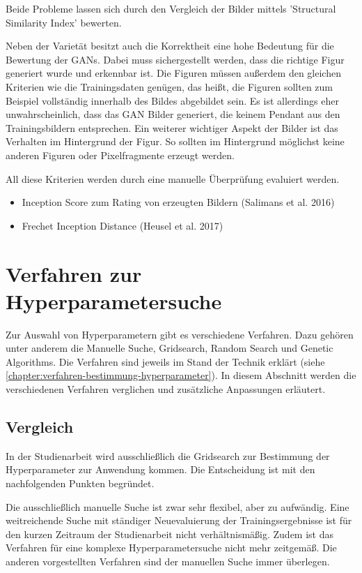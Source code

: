 Beide Probleme lassen sich durch den Vergleich der Bilder mittels 'Structural Similarity Index' \cite{structural-similarity-index} bewerten.

Neben der Varietät besitzt auch die Korrektheit eine hohe Bedeutung für die Bewertung der GANs.
Dabei muss sichergestellt werden, dass die richtige Figur generiert wurde und erkennbar ist.
Die Figuren müssen außerdem den gleichen Kriterien wie die Trainingsdaten genügen, das heißt, die Figuren sollten zum Beispiel vollständig innerhalb des Bildes abgebildet sein.
Es ist allerdings eher unwahrscheinlich, dass das GAN Bilder generiert, die keinem Pendant aus den Trainingsbildern entsprechen.
Ein weiterer wichtiger Aspekt der Bilder ist das Verhalten im Hintergrund der Figur.
So sollten im Hintergrund möglichst keine anderen Figuren oder Pixelfragmente erzeugt werden.

All diese Kriterien werden durch eine manuelle Überprüfung evaluiert werden.

\begin{itemize}
	\item Inception Score zum Rating von erzeugten Bildern (Salimans et al. 2016)
	\item Frechet Inception Distance (Heusel et al. 2017)
\end{itemize}

\section{Verfahren zur Hyperparametersuche}
Zur Auswahl von Hyperparametern gibt es verschiedene Verfahren.
Dazu gehören unter anderem die Manuelle Suche, Gridsearch, Random Search und Genetic Algorithms.
Die Verfahren sind jeweils im Stand der Technik erklärt (siehe \cref{chapter:verfahren-bestimmung-hyperparameter}).
In diesem Abschnitt werden die verschiedenen Verfahren verglichen und zusätzliche Anpassungen erläutert.

\subsection{Vergleich}
In der Studienarbeit wird ausschließlich die Gridsearch zur Bestimmung der Hyperparameter zur Anwendung kommen.
Die Entscheidung ist mit den nachfolgenden Punkten begründet.

Die ausschließlich manuelle Suche ist zwar sehr flexibel, aber zu aufwändig.
Eine weitreichende Suche mit ständiger Neuevaluierung der Trainingsergebnisse ist für den kurzen Zeitraum der Studienarbeit nicht verhältnismäßig.
Zudem ist das Verfahren für eine komplexe Hyperparametersuche nicht mehr zeitgemäß.
Die anderen vorgestellten Verfahren sind der manuellen Suche immer überlegen.

